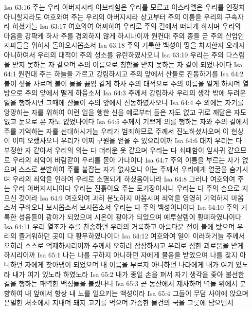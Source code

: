 Isa 63:16  주는 우리 아버지시라 아브라함은 우리를 모르고 이스라엘은 우리를 인정치 아니할지라도 여호와여 주는 우리의 아버지시라 상고부터 주의 이름을 우리의 구속자라 하셨거늘
Isa 63:17  여호와여 어찌하여 우리로 주의 길에서 떠나게 하시며 우리의 마음을 강퍅케 하사 주를 경외하지 않게 하시나이까 원컨대 주의 종들 곧 주의 산업인 지파들을 위하사 돌아오시옵소서
Isa 63:18  주의 거룩한 백성이 땅을 차지한지 오래지 아니하여서 우리의 대적이 주의 성소를 유린하였사오니
Isa 63:19  우리는 주의 다스림을 받지 못하는 자 같으며 주의 이름으로 칭함을 받지 못하는 자 같이 되었나이다
Isa 64:1  원컨대 주는 하늘을 가르고 강림하시고 주의 앞에서 산들로 진동하기를
Isa 64:2  불이 섶을 사르며 불이 물을 끓임 같게 하사 주의 대적으로 주의 이름을 알게 하시며 열방으로 주의 앞에서 떨게 하옵소서
Isa 64:3  주께서 강림하사 우리의 생각 밖에 두려운 일을 행하시던 그때에 산들이 주의 앞에서 진동하였사오니
Isa 64:4  주 외에는 자기를 앙망하는 자를 위하여 이런 일을 행한 신을 예로부터 들은 자도 없고 귀로 깨달은 자도 없고 눈으로 본 자도 없었나이다
Isa 64:5  주께서 기쁘게 의를 행하는 자와 주의 길에서 주를 기억하는 자를 선대하시거늘 우리가 범죄하므로 주께서 진노하셨사오며 이 현상이 이미 오랬사오니 우리가 어찌 구원을 얻을 수 있으리이까
Isa 64:6  대저 우리는 다 부정한 자 같아서 우리의 의는 다 더러운 옷 같으며 우리는 다 쇠패함이 잎사귀 같으므로 우리의 죄악이 바람같이 우리를 몰아 가나이다
Isa 64:7  주의 이름을 부르는 자가 없으며 스스로 분발하여 주를 붙잡는 자가 없사오니 이는 주께서 우리에게 얼굴을 숨기시며 우리의 죄악을 인하여 우리로 소멸되게 하셨음이니라
Isa 64:8  그러나 여호와여 주는 우리 아버지시니이다 우리는 진흙이요 주는 토기장이시니 우리는 다 주의 손으로 지으신 것이라
Isa 64:9  여호와여 과히 분노하지 마옵시며 죄악을 영영히 기억하지 마옵소서 구하오니 보시옵소서 보시옵소서 우리는 다 주의 백성이니이다
Isa 64:10  주의 거룩한 성읍들이 광야가 되었으며 시온이 광야가 되었으며 예루살렘이 황폐하였나이다
Isa 64:11  우리 열조가 주를 찬송하던 우리의 거룩하고 아름다운 전이 불에 탔으며 우리의 즐거워하던 곳이 다 황무하였나이다
Isa 64:12  여호와여 일이 이러하거늘 주께서 오히려 스스로 억제하시리이까 주께서 오히려 잠잠하시고 우리로 심한 괴로움을 받게 하시리이까
Isa 65:1  나는 나를 구하지 아니하던 자에게 물음을 받았으며 나를 찾지 아니하던 자에게 찾아냄이 되었으며 내 이름을 부르지 아니하던 나라에게 내가 여기 있노라 내가 여기 있노라 하였노라
Isa 65:2  내가 종일 손을 펴서 자기 생각을 좇아 불선한 길을 행하는 패역한 백성들을 불렀나니
Isa 65:3  곧 동산에서 제사하며 벽돌 위에서 분향하여 내 앞에서 항상 내 노를 일으키는 백성이라
Isa 65:4  그들이 무덤 사이에 앉으며 은밀한 처소에서 지내며 돼지 고기를 먹으며 가증한 물건의 국을 그릇에 담으면서
